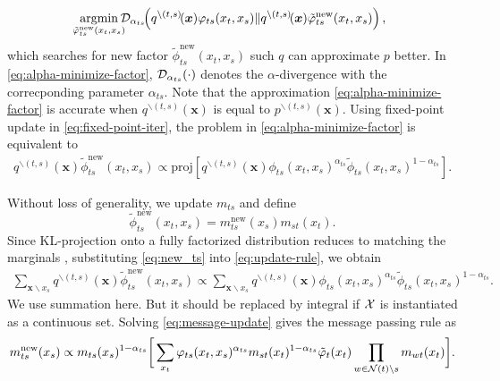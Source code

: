 \begin{equation}\label{eq:alpha-minimize-factor}
  \!\!\!\uargmin{\tilde{\phi}_{ts}^{\mathrm{new}}(x_t, x_s)}\!\!\!\!
  \Dd_{\alpha_{ts}}\!\!\left( q^{\backslash (t,s)}\!(\bm{x}){\phi}_{ts}(x_t, x_s)
    \|q^{\backslash (t,s)}\!(\bm{x})\tilde{\phi}_{ts}^{\mathrm{new}}(x_t, x_s) \right),
\end{equation}
which searches for new factor $\tilde{\phi}_{ts}^{\mathrm{new}}(x_t, x_s)$ such $q$ can approximate $p$ better. In \eqref{eq:alpha-minimize-factor}, $\mathcal{D}_{\alpha_{ts}}(\cdot)$ denotes the $\alpha$-divergence with the correcponding parameter $\alpha_{ts}$. Note that the approximation \eqref{eq:alpha-minimize-factor} is accurate when $q^{\backslash (t,s)}(\bm{x})$ is equal to $p^{\backslash (t,s)}(\bm{x})$. 
Using fixed-point update in \eqref{eq:fixed-point-iter}, the problem in \eqref{eq:alpha-minimize-factor} is equivalent to
\begin{align}\label{eq:update-rule}
  q^{\backslash (t,s)}(\bm{x})\tilde{\phi}_{ts}^{\mathrm{new}}(x_t, x_s) \propto
  \mathrm{proj}\left[ q^{\backslash
  (t,s)}(\bm{x}){\phi}_{ts}(x_t, x_s)^{\alpha_{ts}} \tilde{\phi}_{ts}(x_t, x_s)^{1-\alpha_{ts}} \right]. 
\end{align}

Without loss of generality, we update $m_{ts}$ and define
\begin{equation}\label{eq:new_ts}
  \tilde{\phi}_{ts}^{\mathrm{new}}(x_t, x_s) = m_{ts}^{\mathrm{new}}(x_s) m_{st}(x_t).
\end{equation}
Since KL-projection onto a fully factorized distribution reduces to matching the marginals \cite[Proposition~8.3]{koller2009pgm}, substituting \eqref{eq:new_ts} into \eqref{eq:update-rule}, we obtain
\begin{align}\label{eq:message-update}
  \sum_{\bm{x}\backslash x_s} q^{\backslash (t,s)}(\bm{x}) \tilde{\phi}_{ts}^{\mathrm{new}}(x_t, x_s) 
  \propto \sum_{\bm{x}\backslash x_s} q^{\backslash (t,s)}(\bm{x}) \phi_{ts}(x_t, x_s)^{\alpha_{ts}} \tilde{\phi}_{ts}(x_t, x_s)^{1-\alpha_{ts}}.
\end{align}
We use summation here. But it should be replaced by integral if $\mathcal{X}$ is instantiated as a continuous set.
Solving \eqref{eq:message-update} gives the message passing rule as
\begin{align}\label{eq:message-rule-pairwise}
  {m}^{\text{new}}_{ts}(x_s) \propto  m_{ts}(x_s)^{1-\alpha_{ts}} \bigg[\sum_{x_t} \varphi_{ts}(x_t, x_s)^{\alpha_{ts}} {m}_{st}(x_t)^{1-\alpha_{ts}}\tilde{\varphi}_t(x_t) \prod_{w\in \mathcal{N}(t)\backslash s}m_{wt}(x_t) \bigg].
\end{align}

